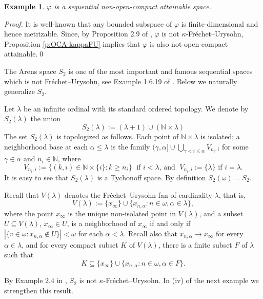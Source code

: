 \documentclass[preprint,11pt]{elsarticle}
\newtheorem{example}[theorem]{Example}
\numberwithin{equation}{section}
\numberwithin{theorem}{section}
\newcommand{\w}{\omega}
\newcommand{\NN}{\mathbb{N}}
\begin{document}
\begin{example}  \label{exa:OCA-varphi}
$\varphi$ is a sequential non-open-compact attainable space.
\end{example}

\begin{proof}
It is well-known that any bounded subspace of $\varphi$ is finite-dimensional and hence metrizable. Since, by Proposition 2.9 of \cite{Gabr-B1}, $\varphi$ is not $\kappa$-Fr\'{e}chet--Urysohn, Proposition \ref{p:OCA-kappaFU} implies that $\varphi$ is also not open-compact attainable.\qed
\end{proof}

The Arens space $S_2$ is one of the most important and famous sequential spaces which is not Fr\'{e}chet--Urysohn, see Example 1.6.19 of \cite{Eng}. Below we naturally generalize  $S_2$.

Let $\lambda$ be an infinite ordinal with its standard ordered topology. We denote by $S_2(\lambda)$ the union
\[
S_2(\lambda):=  (\lambda+1) \cup (\NN\times\lambda)
\]
The set $S_2(\lambda)$ is topologized as follows. Each point of $\NN\times\lambda$ is isolated; a neighborhood base at each $\alpha\leq\lambda$ is the family
$
(\gamma,\alpha]\cup \bigcup_{\gamma<i\leq \alpha} V_{n_i,i}
$
for some $\gamma\in \alpha$ and $n_i\in\NN$, where
\[
V_{n_i,i}:=\big\{(k,i)\in\NN\times\{i\}: k\geq n_i\big\} \; \mbox{ if $i<\lambda$, and }\; V_{n_i,i}:=\{\lambda\} \mbox{ if $i=\lambda$}.
\]
It is easy to see that $S_2(\lambda)$ is a Tychonoff space. By definition $S_2(\w)=S_2$.


Recall that $V(\lambda)$ denotes the Fr\'{e}chet--Urysohn fan of cardinality $\lambda$, that is,
\[
V(\lambda):=\{x_\infty\}\cup \{x_{n,\alpha}: n\in\w, \alpha\in\lambda\},
\]
where the point $x_\infty$ is the unique non-isolated point in $V(\lambda)$, and a subset $U\subseteq V(\lambda)$, $x_\infty\in U$, is a neighborhood of $x_\infty$ if and only if $|\{v\in\w: x_{n,\alpha}\notin U\}|<\w$ for each $\alpha<\lambda$. Recall also that $x_{n,\alpha}\to x_\infty$ for every $\alpha\in\lambda$, and for every compact subset $K$ of $V(\lambda)$, there is a finite subset $F$ of $\lambda$ such that
\[
K\subseteq \{x_\infty\}\cup \{x_{n,\alpha}: n\in\w, \alpha\in F\}.
\]


By Example 2.4 in \cite{LiL}, $S_2$ is not $\kappa$-Fr\'{e}chet--Urysohn. In (iv) of the next example we strengthen this result.
\end{document}
